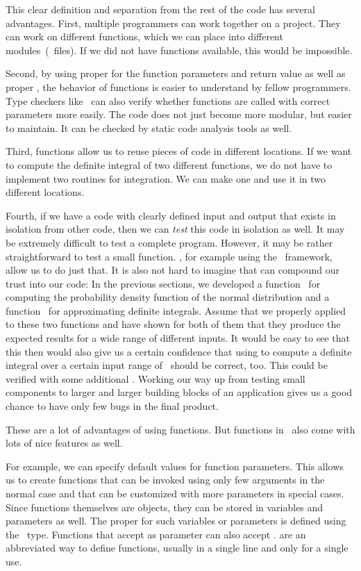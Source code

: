 This clear definition and separation from the rest of the code has several advantages.
First, multiple programmers can work together on a project.
They can work on different functions, which we can place into different modules~(\python\ files).
If we did not have functions available, this would be impossible.

Second, by using proper  for the function parameters and return value as well as proper , the behavior of functions is easier to understand by fellow programmers.
Type checkers like \mypy\ can also verify whether functions are called with correct parameters more easily.
The code does not just become more modular, but easier to maintain.
It can be checked by static code analysis tools as well.

Third, functions allow us to reuse pieces of code in different locations.
If we want to compute the definite integral of two different functions, we do not have to implement two routines for integration.
We can make one and use it in two different locations.

Fourth, if we have a code with clearly defined input and output that exists in isolation from other code, then we can \emph{test} this code in isolation as well.
It may be extremely difficult to test a complete program.
However, it may be rather straightforward to test a small function.
, for example using the \pytest\ framework, allow us to do just that.
It is also not hard to imagine that  can compound our trust into our code:
In the previous sections, we developed a function~ for computing the probability density function of the normal distribution and a function~ for approximating definite integrals.
Assume that we properly applied  to these two functions and have shown for both of them that they produce the expected results for a wide range of different inputs.
It would be easy to see that this then would also give us a certain confidence that using  to compute a definite integral over a certain input range of~ should be correct, too.
This could be verified with some additional .
Working our way up from testing small components to larger and larger building blocks of an application gives us a good chance to have only few bugs in the final product.

These are a lot of advantages of using functions.
But functions in \python\ also come with lots of nice features as well.

For example, we can specify default values for function parameters.
This allows us to create functions that can be invoked using only few arguments in the normal case and that can be customized with more parameters in special cases.
Since functions themselves are objects, they can be stored in variables and parameters as well.
The proper  for such variables or parameters is defined using the~ type.
Functions that accept  as parameter can also accept .
 are an abbreviated way to define functions, usually in a single line and only for a single use.%
\endhsection%
%
\endhsection%
%
